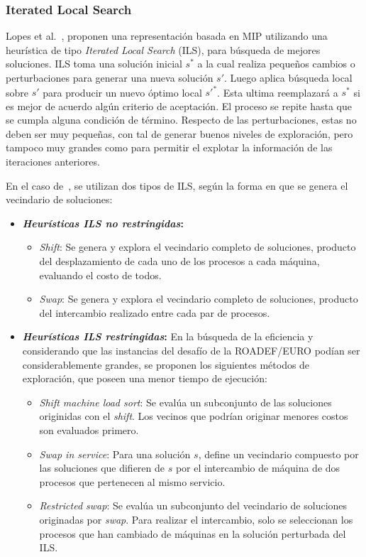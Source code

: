 \documentclass[../informe2.tex]{subfiles}
\begin{document}
\subsubsection{Iterated Local Search}
Lopes et al.~\cite{lopes2015heuristics}, proponen una representación basada en MIP utilizando una heurística de tipo \textit{Iterated Local Search} (ILS), para búsqueda de mejores soluciones. ILS toma una solución inicial $s^{*}$ a la cual realiza pequeños cambios o perturbaciones para generar una nueva solución $s'$. Luego aplica búsqueda local sobre $s'$ para producir un nuevo óptimo local ${s'}^{*}$. Esta ultima reemplazará a $s^{*}$  si es mejor de acuerdo algún criterio de aceptación. El proceso se repite hasta que se cumpla alguna condición de término. Respecto de las perturbaciones, estas no deben ser muy pequeñas, con tal de generar buenos niveles de exploración, pero tampoco muy grandes como para permitir el explotar la información de las iteraciones anteriores. \par
\noindent En el caso de~\cite{lopes2015heuristics}, se utilizan dos tipos de ILS, según la forma en que se genera el vecindario de soluciones:
\begin{itemize}
	\item \textbf{\textit{Heurísticas ILS no restringidas}:}
		\begin{itemize}
			\item \textit{Shift}: Se genera y explora el vecindario completo de soluciones, producto del desplazamiento de cada uno de los procesos a cada máquina, evaluando el costo de todos.
			\item \textit{Swap}: Se genera y explora el vecindario completo de soluciones, producto del intercambio realizado entre cada par de procesos.
		\end{itemize}
	\item \textbf{\textit{Heurísticas ILS restringidas}:} En la búsqueda de la eficiencia y considerando que las instancias del desafío de la ROADEF/EURO podían ser considerablemente grandes, se proponen los siguientes métodos de exploración, que poseen una menor tiempo de ejecución:
		\begin{itemize}
			\item \textit{Shift machine load sort}: Se evalúa un subconjunto de las soluciones originidas con el \emph{shift}. Los vecinos que podrían originar menores costos son evaluados primero.
			\item \textit{Swap in service}:	Para una solución $s$, define un vecindario compuesto por las soluciones que difieren de $s$ por el intercambio de máquina de dos procesos que pertenecen al mismo servicio.
			\item \textit{Restricted swap}: Se evalúa un subconjunto del vecindario de soluciones originadas por \emph{swap}. Para realizar el intercambio, solo se seleccionan los procesos que han cambiado de máquinas en la solución perturbada del ILS\@.
		\end{itemize}
\end{itemize}
\end{document}
